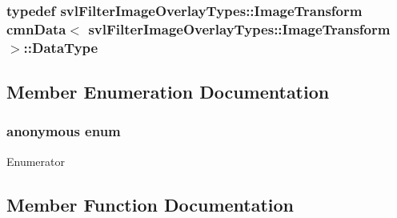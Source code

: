 \subsubsection[{Data\+Type}]{\setlength{\rightskip}{0pt plus 5cm}typedef {\bf svl\+Filter\+Image\+Overlay\+Types\+::\+Image\+Transform} {\bf cmn\+Data}$<$ {\bf svl\+Filter\+Image\+Overlay\+Types\+::\+Image\+Transform} $>$\+::{\bf Data\+Type}}\label{classcmn_data_3_01svl_filter_image_overlay_types_1_1_image_transform_01_4_a58a4f448e85eeba8ac6a226c91e752d7}


\subsection{Member Enumeration Documentation}
\hypertarget{classcmn_data_3_01svl_filter_image_overlay_types_1_1_image_transform_01_4_a921ed53da3a18b827bf192a30785b645}{}\subsubsection[{anonymous enum}]{\setlength{\rightskip}{0pt plus 5cm}anonymous enum}\label{classcmn_data_3_01svl_filter_image_overlay_types_1_1_image_transform_01_4_a921ed53da3a18b827bf192a30785b645}
\begin{Desc}
\item[Enumerator]\par
\begin{description}
\item[{\em 
\hypertarget{classcmn_data_3_01svl_filter_image_overlay_types_1_1_image_transform_01_4_a921ed53da3a18b827bf192a30785b645a19f4b42a979d0470b8d1b2861a0f1e89}{}I\+S\+\_\+\+S\+P\+E\+C\+I\+A\+L\+I\+Z\+E\+D\label{classcmn_data_3_01svl_filter_image_overlay_types_1_1_image_transform_01_4_a921ed53da3a18b827bf192a30785b645a19f4b42a979d0470b8d1b2861a0f1e89}
}]\end{description}
\end{Desc}


\subsection{Member Function Documentation}
\hypertarget{classcmn_data_3_01svl_filter_image_overlay_types_1_1_image_transform_01_4_aadecdc0e5622caa1717bf134ee5e3d4d}{}
